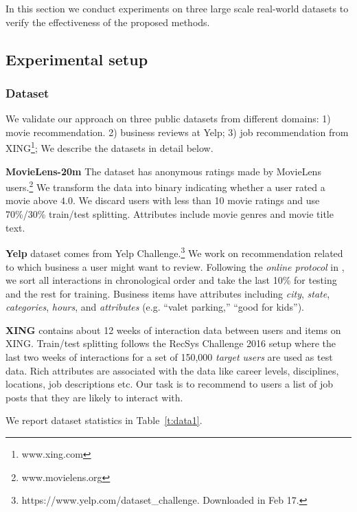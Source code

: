 \documentclass[letterpaper]{article} %
\begin{document}
In this section we conduct experiments on three large scale real-world datasets to verify the effectiveness of the proposed methods.

\subsection{Experimental setup}
\subsubsection{Dataset}

We validate our approach on three public datasets from different domains: 1) movie recommendation. 2) business reviews at Yelp; 3) job recommendation from XING\footnote{www.xing.com}; We describe the datasets in detail below.

\noindent\textbf{MovieLens-20m} The dataset has anonymous ratings made by MovieLens users.\footnote{www.movielens.org} We transform the data into binary indicating whether a user rated a movie above $4.0$. We discard users with less than 10 movie ratings and use 70\%/30\% train/test splitting. Attributes include movie genres and movie title text.

\noindent\textbf{Yelp} dataset comes from Yelp Challenge.\footnote{https://www.yelp.com/dataset\_challenge. Downloaded in Feb 17.} We work on recommendation related to which business a user might want to review. Following the \textit{online protocol} in \cite{he2016fast}, we sort all interactions in chronological order and take the last 10\% for testing and the rest for training. Business items have attributes including \textit{city}, \textit{state}, \textit{categories}, \textit{hours}, and \textit{attributes} (e.g. ``valet parking,'' ``good for kids'').

\noindent\textbf{XING} contains about 12 weeks of interaction data between users and items on XING. Train/test splitting follows the RecSys Challenge 2016 \cite{abel2016recsys} setup where the last two weeks of interactions for a set of 150,000 \textit{target users} are used as test data. Rich attributes are associated with the data like career levels, disciplines, locations, job descriptions etc. Our task is to recommend to users a list of job posts that they are likely to interact with.

We report dataset statistics in Table~\ref{t:data1}.
\end{document}
